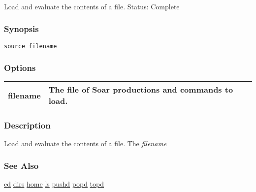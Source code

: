\subsection{}
\label{source}
Load and evaluate the contents of a file. 
 Status: Complete
\subsubsection*{Synopsis}
\begin{verbatim}
source filename
\end{verbatim}
\subsubsection*{Options}
\begin{tabular}{|l|l|}
\hline 
filename & The file of Soar productions and commands to load.  \\
 \hline 
\end{tabular}
\subsubsection*{Description}
 Load and evaluate the contents of a file. The \emph{filename}
\subsubsection*{See Also}
\hyperref[cd]{cd} \hyperref[dirs]{dirs} \hyperref[home]{home} \hyperref[ls]{ls} \hyperref[pushd]{pushd} \hyperref[popd]{popd} \hyperref[topd]{topd} 